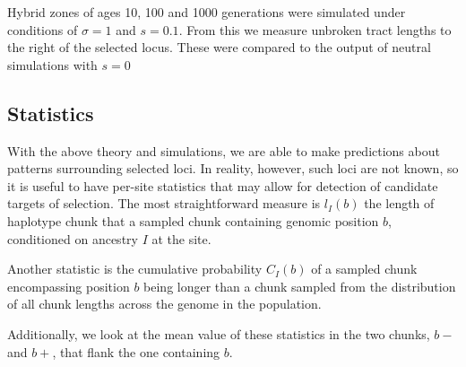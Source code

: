 \documentclass[12pt]{article}
\begin{document}
Hybrid zones of ages 10, 100 and 1000 generations were simulated under conditions of $\sigma=1$ and $s=0.1$. From this we measure unbroken tract lengths to the right of the selected locus. These were compared to the output of neutral simulations with $s=0$


\subsection{Statistics}
With the above theory and simulations, we are able to make predictions about patterns surrounding selected loci. In reality, however, such loci are not known, so it is useful to have per-site statistics that may allow for detection of candidate targets of selection. The most straightforward measure is $l_I(b)$ the length of haplotype chunk that a sampled chunk containing genomic position $b$, conditioned on ancestry $I$ at the site.

Another statistic is the cumulative probability $C_I(b)$ of a sampled chunk encompassing position $b$ being longer than a chunk sampled from the distribution of all chunk lengths across the genome in the population. 

Additionally, we look at the mean value of these statistics in the two chunks, $b-$ and $b+$, that flank the one containing $b$.






\end{document}
